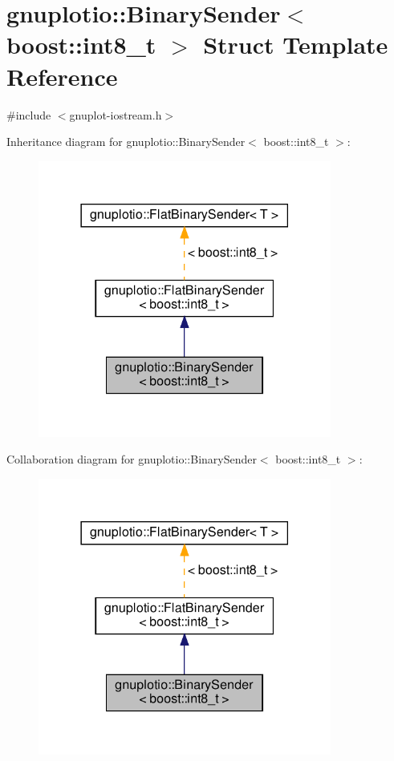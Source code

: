 \hypertarget{structgnuplotio_1_1_binary_sender_3_01boost_1_1int8__t_01_4}{}\section{gnuplotio\+:\+:Binary\+Sender$<$ boost\+:\+:int8\+\_\+t $>$ Struct Template Reference}
\label{structgnuplotio_1_1_binary_sender_3_01boost_1_1int8__t_01_4}


{\ttfamily \#include $<$gnuplot-\/iostream.\+h$>$}



Inheritance diagram for gnuplotio\+:\+:Binary\+Sender$<$ boost\+:\+:int8\+\_\+t $>$\+:
\nopagebreak
\begin{figure}[H]
\begin{center}
\leavevmode
\includegraphics[width=273pt]{structgnuplotio_1_1_binary_sender_3_01boost_1_1int8__t_01_4__inherit__graph}
\end{center}
\end{figure}


Collaboration diagram for gnuplotio\+:\+:Binary\+Sender$<$ boost\+:\+:int8\+\_\+t $>$\+:
\nopagebreak
\begin{figure}[H]
\begin{center}
\leavevmode
\includegraphics[width=273pt]{structgnuplotio_1_1_binary_sender_3_01boost_1_1int8__t_01_4__coll__graph}
\end{center}
\end{figure}
